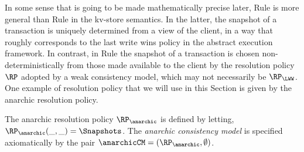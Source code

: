 In some sense that is going to be made mathematically precise later, Rule  is more general 
than Rule  in the kv-store semantics. In the latter, the snapshot of a transaction is uniquely 
determined from a view of the client, in a way that roughly corresponds to the last write wins policy 
in the abstract execution framework. In contrast, in Rule  the snapshot of a transaction 
is chosen non-deterministically from those made available to the client by the resolution policy 
$\RP$ adopted by a weak consistency model, which may not necessarily be $\RP_{\LWW}$. 
One example of resolution policy that we will use in this Section is given by the anarchic resolution policy. 

\begin{definition}
The anarchic resolution policy $\RP_{\anarchic}$ is defined by letting, 
$\RP_{\anarchic}(\_, \_) = \Snapshots$. The \emph{anarchic consistency model} is 
specified axiomatically by the pair $\anarchicCM = (\RP_{\anarchic}, \emptyset)$.
\end{definition}

